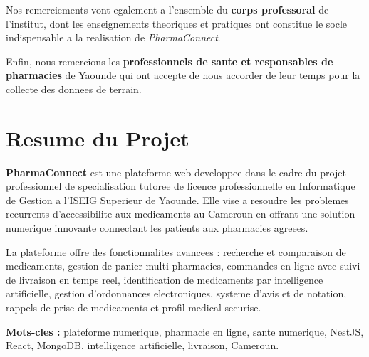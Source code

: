 \documentclass[12pt,a4paper]{report}
\begin{document}
\bigskip
Nos remerciements vont egalement a l'ensemble du \textbf{corps professoral} de l'institut, dont les enseignements theoriques et pratiques ont constitue le socle indispensable a la realisation de \textit{PharmaConnect}.

\bigskip
Enfin, nous remercions les \textbf{professionnels de sante et responsables de pharmacies} de Yaounde qui ont accepte de nous accorder de leur temps pour la collecte des donnees de terrain.

\tableofcontents

\listoffigures
{}

\listoftables
{}

\chapter*{Resume du Projet}

\begin{mdframed}[linecolor=vertpharma,linewidth=1.5pt,roundcorner=6pt,backgroundcolor=vertpharma!5]
\textbf{PharmaConnect} est une plateforme web developpee dans le cadre du projet professionnel de specialisation tutoree de licence professionnelle en Informatique de Gestion a l'ISEIG Superieur de Yaounde. Elle vise a resoudre les problemes recurrents d'accessibilite aux medicaments au Cameroun en offrant une solution numerique innovante connectant les patients aux pharmacies agreees.

\medskip
La plateforme offre des fonctionnalites avancees : recherche et comparaison de medicaments, gestion de panier multi-pharmacies, commandes en ligne avec suivi de livraison en temps reel, identification de medicaments par intelligence artificielle, gestion d'ordonnances electroniques, systeme d'avis et de notation, rappels de prise de medicaments et profil medical securise.

\medskip
\textbf{Mots-cles :} plateforme numerique, pharmacie en ligne, sante numerique, NestJS, React, MongoDB, intelligence artificielle, livraison, Cameroun.
\end{mdframed}

\end{document}
